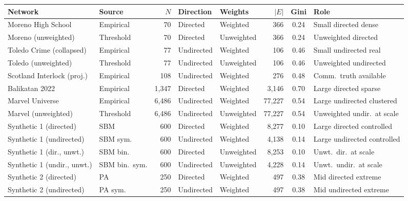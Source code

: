 \documentclass[11pt]{article}
\begin{document}
\begin{table}[h]
\centering
\footnotesize
\begin{tabular}{l l r l l r c l}
\toprule
\textbf{Network} & \textbf{Source} & \textbf{$N$} & \textbf{Direction} & \textbf{Weights} & \textbf{$\lvert E \rvert$} & \textbf{Gini} & \textbf{Role} \\
\midrule
Moreno High School         & Empirical       & 70       & Directed   & Weighted   & 366     & 0.24 & Small directed dense \\
Moreno (unweighted)        & Threshold       & 70       & Directed   & Unweighted & 366     & 0.24 & Unweighted directed \\
Toledo Crime (collapsed)   & Empirical       & 77       & Undirected & Weighted   & 106     & 0.46 & Small undirected real \\
Toledo (unweighted)        & Threshold       & 77       & Undirected & Unweighted & 106     & 0.46 & Unweighted undirected \\
Scotland Interlock (proj.) & Empirical       & 108      & Undirected & Weighted   & 276     & 0.48 & Comm.\ truth available \\
Balikatan 2022             & Empirical       & 1{,}347  & Directed   & Weighted   & 3{,}146 & 0.70 & Large directed sparse \\
Marvel Universe            & Empirical       & 6{,}486  & Undirected & Weighted   & 77{,}227 & 0.54 & Large undirected clustered \\
Marvel (unweighted)        & Threshold       & 6{,}486  & Undirected & Unweighted & 77{,}227 & 0.54 & Unweighted undir.\ at scale \\
Synthetic 1 (directed)     & SBM             & 600      & Directed   & Weighted   & 8{,}277 & 0.10 & Large directed controlled \\
Synthetic 1 (undirected)   & SBM sym.        & 600      & Undirected & Weighted   & 4{,}138 & 0.14 & Large undirected controlled \\
Synthetic 1 (dir., unwt.)  & SBM bin.        & 600      & Directed   & Unweighted & 8{,}253 & 0.10 & Unwt.\ dir.\ at scale \\
Synthetic 1 (undir., unwt.) & SBM bin.\ sym. & 600      & Undirected & Unweighted & 4{,}228 & 0.14 & Unwt.\ undir.\ at scale \\
Synthetic 2 (directed)     & PA              & 250      & Directed   & Weighted   & 497     & 0.38 & Mid directed extreme \\
Synthetic 2 (undirected)   & PA sym.         & 250      & Undirected & Weighted   & 497     & 0.38 & Mid undirected extreme \\

\end{tabular}
\end{table}
\end{document}
